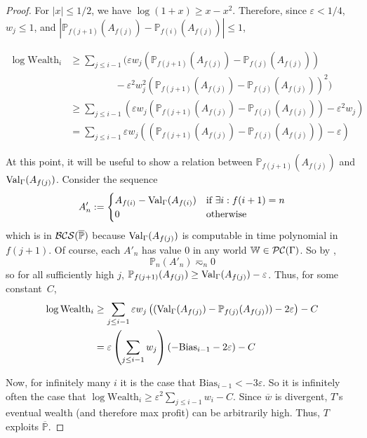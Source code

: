\documentclass[authordate,onecolumn,noenvironments]{miri-tech-article}
\numberwithin{equation}{subsection}
\newcommand{\seq}[1]{{\overline{#1}}}
\newcommand{\nn}{n}
\newcommand{\fuz}{w}
\newcommand{\deff}{f}
\newcommand{\aff}{A}
\newcommand{\BCS}[1][\MP]{\mathcal{B\-C\-S}(#1)} %
\newcommand{\BelState}{\mathbb{P}}
\newcommand{\pt}{\BelState}
\newcommand{\MP}{\seq{\pt}}
\newcommand{\cworlds}{\mathcal{P\-C}} %
\newcommand{\World}{\mathbb{W}}
\newcommand{\Theory}{\Gamma}
\newcommand{\thmval}[1][\Theory]{\operatorname{Val}_{#1}\-} %
\begin{document}
\begin{proof}
For $|x| \leq 1/2$, we have $\log (1 + x) \geq x - x^2$.  Therefore, since $\varepsilon < 1/4$, $\fuz_j \leq 1$, and $|\pt_{\deff(j+1)}(\aff_{\deff(j)}) - \pt_{\deff(i)}(\aff_{\deff(j)})| \leq 1$,

\begin{align*}
  \log \mathrm{Wealth}_i &\geq 
  \sum_{j\le i-1} \Big(
    \varepsilon \fuz_j (\pt_{\deff(j+1)}(\aff_{\deff(j)}) - \pt_{\deff(j)}(\aff_{\deff(j)})) \\[-1em]
    & \phantom{xxxxxxxx} - \varepsilon^2 \fuz_j^2 (\pt_{\deff(j+1)}(\aff_{\deff(j)}) - \pt_{\deff(j)}(\aff_{\deff(j)}))^2 
  \Big)
  \\
  &\geq
  \sum_{j\le i-1} \left( \varepsilon \fuz_j (\pt_{\deff(j+1)}(\aff_{\deff(j)}) - \pt_{\deff(j)}(\aff_{\deff(j)})) - \varepsilon^2\fuz_j \right)
  \\
  &=
  \sum_{j\le i-1} \varepsilon \fuz_j\left( (\pt_{\deff(j+1)}(\aff_{\deff(j)}) - \pt_{\deff(j)}(\aff_{\deff(j)})) - \varepsilon \right)
\end{align*}

At this point, it will be useful to show a relation between $\pt_{\deff(j+1)}(\aff_{\deff(j)})$ and $\thmval(\aff_{\deff(j)})$.  Consider the sequence
\[ \aff'_\nn := \begin{cases}
  \aff_{\deff(i)} - \thmval(\aff_{\deff(i)})& \text{if $\exists i: \deff(i+1) = \nn$}
  \\
  0 & \text{otherwise}
\end{cases}
\]
 which is in $\BCS$ because $\thmval(\aff_{\deff(j)})$ is computable in time polynomial in $\deff(j+1)$.
Of course, each $\aff'_\nn$ has value 0 in any world $\World \in \cworlds(\Theory)$.
So by ,
\[ \pt_\nn(\aff'_\nn) \eqsim_\nn 0 \]
so for all sufficiently high $j$, $\pt_{\deff(j+1)}(\aff_{\deff(j)}) \geq \thmval(\aff_{\deff(j)})-\varepsilon$.  Thus, for some constant~$C$,
\begin{align*}
  \log \mathrm{Wealth}_i 
  &\geq 
  \sum_{j\le i-1} \varepsilon \fuz_j \left( (\thmval(\aff_{\deff(j)}) - \pt_{\deff(j)}(\aff_{\deff(j)})) - 2 \varepsilon \right) - C
  \\
  &=
  \varepsilon \left( \sum_{j\le i-1} \fuz_j \right) (-\mathrm{Bias}_{i-1} - 2 \varepsilon) - C
\end{align*}

Now, for infinitely many $i$ it is the case that $\mathrm{Bias}_{i-1} < - 3 \varepsilon$.  So it is infinitely often the case that $\log \mathrm{Wealth}_i \geq \varepsilon^2 \sum_{j\le i - 1} \fuz_i - C$.  Since $\seq\fuz$ is divergent, $T$'s eventual wealth (and therefore max profit) can be arbitrarily high.  Thus, $T$ exploits $\MP$.
\end{proof}
\end{document}
